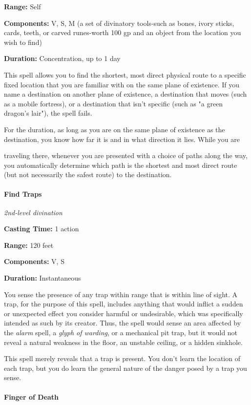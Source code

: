 \documentclass[
]{article}
\begin{document}
\textbf{Range:} Self

\textbf{Components:} V, S, M (a set of divinatory tools-such as bones,
ivory sticks, cards, teeth, or carved runes-worth 100 gp and an object
from the location you wish to find)

\textbf{Duration:} Concentration, up to 1 day

This spell allows you to find the shortest, most direct physical route
to a specific fixed location that you are familiar with on the same
plane of existence. If you name a destination on another plane of
existence, a destination that moves (such as a mobile fortress), or a
destination that isn't specific (such as "a green dragon's lair"), the
spell fails.

For the duration, as long as you are on the same plane of existence as
the destination, you know how far it is and in what direction it lies.
While you are

traveling there, whenever you are presented with a choice of paths along
the way, you automatically determine which path is the shortest and most
direct route (but not necessarily the safest route) to the destination.

\hypertarget{find-traps}{%
\paragraph{Find Traps}\label{find-traps}}

\emph{2nd-level divination}

\textbf{Casting Time:} 1 action

\textbf{Range:} 120 feet

\textbf{Components:} V, S

\textbf{Duration:} Instantaneous

You sense the presence of any trap within range that is within line of
sight. A trap, for the purpose of this spell, includes anything that
would inflict a sudden or unexpected effect you consider harmful or
undesirable, which was specifically intended as such by its creator.
Thus, the spell would sense an area affected by the \emph{alarm} spell,
a \emph{glyph of warding}, or a mechanical pit trap, but it would not
reveal a natural weakness in the floor, an unstable ceiling, or a hidden
sinkhole.

This spell merely reveals that a trap is present. You don't learn the
location of each trap, but you do learn the general nature of the danger
posed by a trap you sense.

\hypertarget{finger-of-death}{%
\paragraph{Finger of Death}\label{finger-of-death}}
\end{document}
